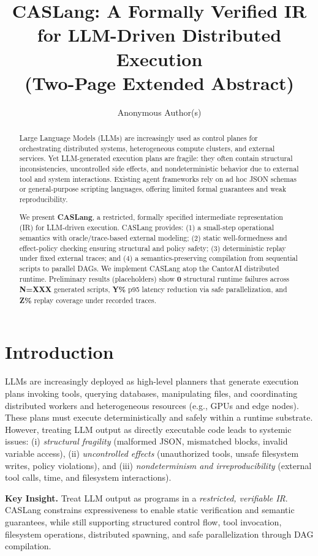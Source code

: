 \documentclass[sigplan,nonacm,10pt]{acmart}
\title{CASLang: A Formally Verified IR for LLM-Driven Distributed Execution\\(Two-Page Extended Abstract)}
\author{Anonymous Author(s)}
\affiliation{\institution{Anonymous}}
\begin{document}
\begin{abstract}
Large Language Models (LLMs) are increasingly used as control planes for orchestrating distributed systems, heterogeneous compute clusters, and external services. Yet LLM-generated execution plans are fragile: they often contain structural inconsistencies, uncontrolled side effects, and nondeterministic behavior due to external tool and system interactions. Existing agent frameworks rely on ad hoc JSON schemas or general-purpose scripting languages, offering limited formal guarantees and weak reproducibility.

We present \textbf{CASLang}, a restricted, formally specified intermediate representation (IR) for LLM-driven execution. CASLang provides: (1) a small-step operational semantics with oracle/trace-based external modeling; (2) static well-formedness and effect-policy checking ensuring structural and policy safety; (3) deterministic replay under fixed external traces; and (4) a semantics-preserving compilation from sequential scripts to parallel DAGs. We implement CASLang atop the CantorAI distributed runtime. Preliminary results (placeholders) show \textbf{0} structural runtime failures across \textbf{N=XXX} generated scripts, \textbf{Y\%} p95 latency reduction via safe parallelization, and \textbf{Z\%} replay coverage under recorded traces.
\end{abstract}

\section{Introduction}
LLMs are increasingly deployed as high-level planners that generate execution plans invoking tools, querying databases, manipulating files, and coordinating distributed workers and heterogeneous resources (e.g., GPUs and edge nodes). These plans must execute deterministically and safely within a runtime substrate. However, treating LLM output as directly executable code leads to systemic issues: (i) \emph{structural fragility} (malformed JSON, mismatched blocks, invalid variable access), (ii) \emph{uncontrolled effects} (unauthorized tools, unsafe filesystem writes, policy violations), and (iii) \emph{nondeterminism and irreproducibility} (external tool calls, time, and filesystem interactions).

\textbf{Key Insight.} Treat LLM output as programs in a \emph{restricted, verifiable IR}. CASLang constrains expressiveness to enable static verification and semantic guarantees, while still supporting structured control flow, tool invocation, filesystem operations, distributed spawning, and safe parallelization through DAG compilation.
\end{document}
